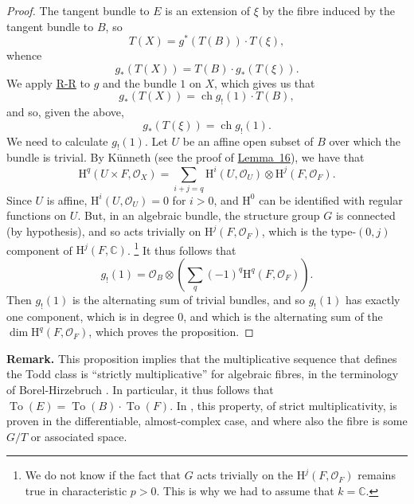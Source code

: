 \documentclass{article}
\newenvironment{rmenv}[1]
  {\phantomsection\par\medskip\noindent\textbf{#1.}\rmfamily}
  {\par\medskip}
\newcommand{\scr}[1]{{\mathscr{#1}}}
\newcommand{\HH}{\mathrm{H}}
\DeclareMathOperator{\ch}{ch}
\newcommand{\oldpage}[1]{\marginpar{\footnotesize$\Big\vert$ \textit{p.~#1}}}
\begin{document}
\begin{proof}
  The tangent bundle to $E$ is an extension of $\xi$ by the fibre induced by the tangent bundle to $B$, so
  \[
    T(X) = g^*(T(B))\cdot T(\xi),
  \]
  whence
  \[
    g_*(T(X)) = T(B)\cdot g_*(T(\xi)).
  \]
  We apply \hyperref[theoremriemannroch]{R-R} to $g$ and the bundle $1$ on $X$, which gives us that
  \[
    g_*(T(X)) = \ch g_!(1)\cdot T(B),
  \]
  and so, given the above,
  \[
    g_*(T(\xi)) = \ch g_!(1).
  \]
  We need to calculate $g_!(1)$.
  Let $U$ be an affine open subset of $B$ over which the bundle is trivial.
  By K\"{u}nneth (see the proof of \hyperref[lemma16]{Lemma~16}), we have that
  \[
    \HH^q(U\times F,\scr{O}_X)
    = \sum_{i+j=q} \HH^i(U,\scr{O}_U)\otimes\HH^j(F,\scr{O}_F).
  \]
  Since $U$ is affine, $\HH^i(U,\scr{O}_U)=0$ for $i>0$, and $\HH^0$ can be identified with regular functions on $U$.
  But, in an algebraic bundle, the structure group $G$ is connected (by hypothesis), and so acts trivially on $\HH^j(F,\scr{O}_F)$, which is the type-$(0,j)$ component of $\HH^j(F,\mathbb{C})$.
  \footnote{We do not know if the fact that $G$ acts trivially on the $\HH^j(F,\scr{O}_F)$ remains true in characteristic $p>0$. This is why we had to assume that $k=\mathbb{C}$.}
  It thus follows that
  \[
    g_!(1)
    = \scr{O}_B \otimes \left(
      \sum_q (-1)^q \HH^q(F,\scr{O}_F)
    \right).
  \]
  Then $g_!(1)$ is the alternating sum of trivial bundles, and so $g_!(1)$ has exactly one component, which is in degree $0$, and which is the alternating sum of the $\dim\HH^q(F,\scr{O}_F)$, which proves the proposition.
\end{proof}

\oldpage{136}
\begin{rmenv}{Remark}
  This proposition implies that the multiplicative sequence that defines the Todd class is ``strictly multiplicative'' for algebraic fibres, in the terminology of Borel-Hirzebruch \cite{2}.
  In particular, it thus follows that $\operatorname{To}(E)=\operatorname{To}(B)\cdot\operatorname{To}(F)$.
  In \cite{2}, this property, of strict multiplicativity, is proven in the differentiable, almost-complex case, and where also the fibre is some $G/T$ or associated space.
\end{rmenv}



\nocite{*}
\end{document}
